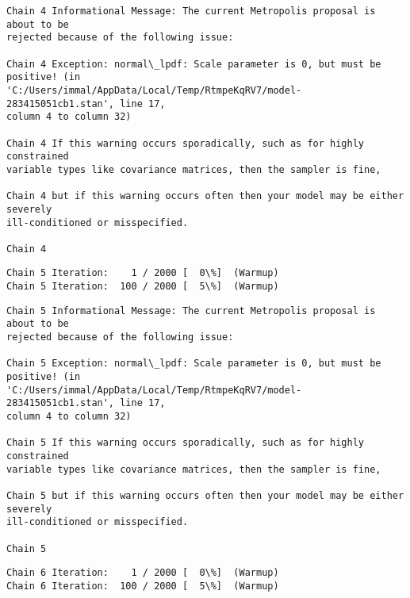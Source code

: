 \documentclass[11pt]{article}
\begin{document}
    \begin{Verbatim}[commandchars=\\\{\}]
Chain 4 Informational Message: The current Metropolis proposal is about to be
rejected because of the following issue:

Chain 4 Exception: normal\_lpdf: Scale parameter is 0, but must be positive! (in
'C:/Users/immal/AppData/Local/Temp/RtmpeKqRV7/model-283415051cb1.stan', line 17,
column 4 to column 32)

Chain 4 If this warning occurs sporadically, such as for highly constrained
variable types like covariance matrices, then the sampler is fine,

Chain 4 but if this warning occurs often then your model may be either severely
ill-conditioned or misspecified.

Chain 4

    \end{Verbatim}

    \begin{Verbatim}[commandchars=\\\{\}]
Chain 5 Iteration:    1 / 2000 [  0\%]  (Warmup)
Chain 5 Iteration:  100 / 2000 [  5\%]  (Warmup)
    \end{Verbatim}

    \begin{Verbatim}[commandchars=\\\{\}]
Chain 5 Informational Message: The current Metropolis proposal is about to be
rejected because of the following issue:

Chain 5 Exception: normal\_lpdf: Scale parameter is 0, but must be positive! (in
'C:/Users/immal/AppData/Local/Temp/RtmpeKqRV7/model-283415051cb1.stan', line 17,
column 4 to column 32)

Chain 5 If this warning occurs sporadically, such as for highly constrained
variable types like covariance matrices, then the sampler is fine,

Chain 5 but if this warning occurs often then your model may be either severely
ill-conditioned or misspecified.

Chain 5

    \end{Verbatim}

    \begin{Verbatim}[commandchars=\\\{\}]
Chain 6 Iteration:    1 / 2000 [  0\%]  (Warmup)
Chain 6 Iteration:  100 / 2000 [  5\%]  (Warmup)
    \end{Verbatim}
\end{document}
